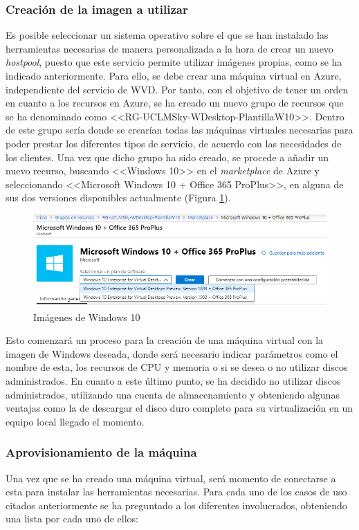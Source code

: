 \subsubsection{Creación de la imagen a utilizar}
Es posible seleccionar un sistema operativo sobre el que se han instalado las herramientas necesarias de manera personalizada a la hora de crear un nuevo \textit{hostpool}, puesto que este servicio permite utilizar imágenes propias, como se ha indicado anteriormente. Para ello, se debe crear una máquina virtual en Azure, independiente del servicio de \acs{WVD}. Por tanto, con el objetivo de tener un orden en cuanto a los recursos en Azure, se ha creado un nuevo grupo de recursos que se ha denominado como <<RG-UCLMSky-WDesktop-PlantillaW10>>. Dentro de este grupo sería donde se crearían todas las máquinas virtuales necesarias para poder prestar los diferentes tipos de servicio, de acuerdo con las necesidades de los clientes. Una vez que dicho grupo ha sido creado, se procede a añadir un nuevo recurso, buscando <<Windows 10>> en el \textit{marketplace} de Azure y seleccionando <<Microsoft Windows 10 + Office 365 ProPlus>>, en alguna de sus dos versiones disponibles actualmente (Figura \ref{fig:seleccion_w10}).

\begin{figure}[h]
  \centering
  \includegraphics[width=0.8\linewidth]{figures/images/casos_uso/MVW10.PNG}
  \caption{Imágenes de Windows 10}
  \label{fig:seleccion_w10}
\end{figure}

Esto comenzará un proceso para la creación de una máquina virtual con la imagen de Windows deseada, donde será necesario indicar parámetros como el nombre de esta, los recursos de \acs{CPU} y memoria o si se desea o no utilizar discos administrados. En cuanto a este último punto, se ha decidido no utilizar discos administrados, utilizando una cuenta de almacenamiento y obteniendo algunas ventajas como la de descargar el disco duro completo para su virtualización en un equipo local llegado el momento.

\subsubsection{Aprovisionamiento de la máquina}
Una vez que se ha creado una máquina virtual, será momento de conectarse a esta para instalar las herramientas necesarias. Para cada uno de los casos de uso citados anteriormente se ha preguntado a los diferentes involucrados, obteniendo una lista por cada uno de ellos:

